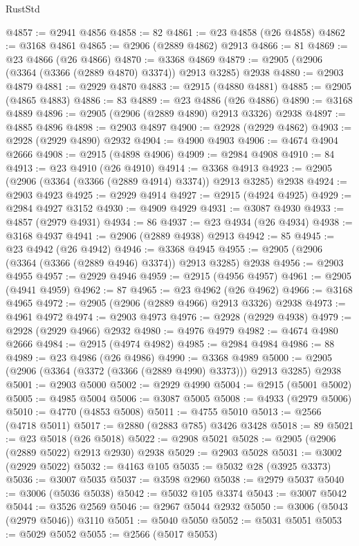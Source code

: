 \begin{lexlean}{RustStd}
\begin{coremodule}
@4857 := @2941 @4856
@4858 := 82
@4861 := @23 @4858 (@26 @4858)
@4862 := @3168 @4861
@4865 := @2906 (@2889 @4862) @2913
@4866 := 81
@4869 := @23 @4866 (@26 @4866)
@4870 := @3368 @4869
@4879 := @2905 (@2906 (@3364 (@3366 (@2889 @4870) @3374)) @2913 @3285) @2938
@4880 := @2903 @4879
@4881 := @2929 @4870
@4883 := @2915 (@4880 @4881)
@4885 := @2905 (@4865 @4883)
@4886 := 83
@4889 := @23 @4886 (@26 @4886)
@4890 := @3168 @4889
@4896 := @2905 (@2906 (@2889 @4890) @2913 @3326) @2938
@4897 := @4885 @4896
@4898 := @2903 @4897
@4900 := @2928 (@2929 @4862)
@4903 := @2928 (@2929 @4890) @2932
@4904 := @4900 @4903
@4906 := @4674 @4904 @2666
@4908 := @2915 (@4898 @4906)
@4909 := @2984 @4908
@4910 := 84
@4913 := @23 @4910 (@26 @4910)
@4914 := @3368 @4913
@4923 := @2905 (@2906 (@3364 (@3366 (@2889 @4914) @3374)) @2913 @3285) @2938
@4924 := @2903 @4923
@4925 := @2929 @4914
@4927 := @2915 (@4924 @4925)
@4929 := @2984 @4927 @3152
@4930 := @4909 @4929
@4931 := @3087 @4930
@4933 := @4857 (@2979 @4931)
@4934 := 86
@4937 := @23 @4934 (@26 @4934)
@4938 := @3168 @4937
@4941 := @2906 (@2889 @4938) @2913
@4942 := 85
@4945 := @23 @4942 (@26 @4942)
@4946 := @3368 @4945
@4955 := @2905 (@2906 (@3364 (@3366 (@2889 @4946) @3374)) @2913 @3285) @2938
@4956 := @2903 @4955
@4957 := @2929 @4946
@4959 := @2915 (@4956 @4957)
@4961 := @2905 (@4941 @4959)
@4962 := 87
@4965 := @23 @4962 (@26 @4962)
@4966 := @3168 @4965
@4972 := @2905 (@2906 (@2889 @4966) @2913 @3326) @2938
@4973 := @4961 @4972
@4974 := @2903 @4973
@4976 := @2928 (@2929 @4938)
@4979 := @2928 (@2929 @4966) @2932
@4980 := @4976 @4979
@4982 := @4674 @4980 @2666
@4984 := @2915 (@4974 @4982)
@4985 := @2984 @4984
@4986 := 88
@4989 := @23 @4986 (@26 @4986)
@4990 := @3368 @4989
@5000 := @2905 (@2906 (@3364 (@3372 (@3366 (@2889 @4990) @3373))) @2913 @3285) @2938
@5001 := @2903 @5000
@5002 := @2929 @4990
@5004 := @2915 (@5001 @5002)
@5005 := @4985 @5004
@5006 := @3087 @5005
@5008 := @4933 (@2979 @5006)
@5010 := @4770 (@4853 @5008)
@5011 := @4755 @5010
@5013 := @2566 (@4718 @5011)
@5017 := @2880 (@2883 @785) @3426 @3428
@5018 := 89
@5021 := @23 @5018 (@26 @5018)
@5022 := @2908 @5021
@5028 := @2905 (@2906 (@2889 @5022) @2913 @2930) @2938
@5029 := @2903 @5028
@5031 := @3002 (@2929 @5022)
@5032 := @4163 @105
@5035 := @5032 @28 (@3925 @3373)
@5036 := @3007 @5035
@5037 := @3598 @2960
@5038 := @2979 @5037
@5040 := @3006 (@5036 @5038)
@5042 := @5032 @105 @3374
@5043 := @3007 @5042
@5044 := @3526 @2569
@5046 := @2967 @5044 @2932
@5050 := @3006 (@5043 (@2979 @5046)) @3110
@5051 := @5040 @5050
@5052 := @5031 @5051
@5053 := @5029 @5052
@5055 := @2566 (@5017 @5053)

\end{coremodule}
\end{lexlean}
